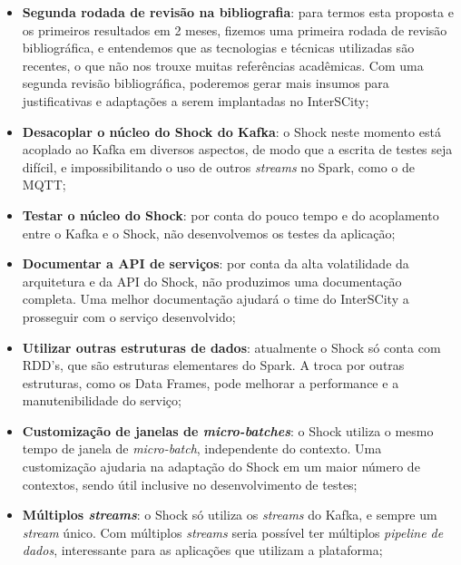 \begin{itemize}
    \item \textbf{Segunda rodada de revisão na bibliografia}: para termos esta
        proposta e os primeiros resultados em 2 meses, fizemos uma primeira
        rodada de revisão bibliográfica, e entendemos que as tecnologias e
        técnicas utilizadas são recentes, o que não nos trouxe muitas
        referências acadêmicas. Com uma segunda revisão bibliográfica,
        poderemos gerar mais insumos para justificativas e adaptações
        a serem implantadas no InterSCity;

    \item \textbf{Desacoplar o núcleo do Shock do Kafka}: o Shock neste
        momento está acoplado ao Kafka em diversos aspectos, de modo que a
        escrita de testes seja difícil, e impossibilitando o uso de outros
        \textit{streams} no Spark, como o de MQTT;

    \item \textbf{Testar o núcleo do Shock}: por conta do pouco tempo e do
        acoplamento entre o Kafka e o Shock, não desenvolvemos os testes da
        aplicação;

    \item \textbf{Documentar a API de serviços}: por conta da alta volatilidade
        da arquitetura e da API do Shock, não produzimos uma documentação
        completa. Uma melhor documentação ajudará o time do InterSCity a
        prosseguir com o serviço desenvolvido;

    \item \textbf{Utilizar outras estruturas de dados}: atualmente o Shock só
        conta com RDD's, que são estruturas elementares do Spark. A troca por
        outras estruturas, como os Data Frames, pode melhorar a performance e a
        manutenibilidade do serviço;

    \item \textbf{Customização de janelas de \textit{micro-batches}}: o Shock
        utiliza o mesmo tempo de janela de \textit{micro-batch}, independente
        do contexto. Uma customização ajudaria na adaptação do Shock
        em um maior número de contextos, sendo útil inclusive no
        desenvolvimento de testes;

    \item \textbf{Múltiplos \textit{streams}}: o Shock só utiliza os
        \textit{streams} do Kafka, e sempre um \textit{stream} único. Com
        múltiplos \textit{streams} seria possível ter múltiplos \textit{
        pipeline de dados}, interessante para as aplicações que utilizam
        a plataforma;


\end{itemize}
